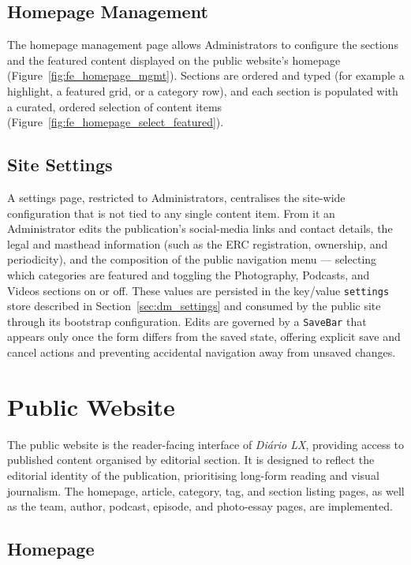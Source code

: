 \subsection{Homepage Management} \label{sec:fe_homepage_mgmt_sec}

The homepage management page allows Administrators to configure the sections and the
featured content displayed on the public website's homepage
(Figure~\ref{fig:fe_homepage_mgmt}). Sections are ordered and typed (for example a
highlight, a featured grid, or a category row), and each section is populated with a
curated, ordered selection of content items (Figure~\ref{fig:fe_homepage_select_featured}).

\subsection{Site Settings} \label{sec:fe_settings}

A settings page, restricted to Administrators, centralises the site-wide configuration
that is not tied to any single content item. From it an Administrator edits the
publication's social-media links and contact details, the legal and masthead information
(such as the ERC registration, ownership, and periodicity), and the composition of the
public navigation menu --- selecting which categories are featured and toggling the
Photography, Podcasts, and Videos sections on or off. These values are persisted in the
key/value \texttt{settings} store described in Section~\ref{sec:dm_settings} and consumed
by the public site through its bootstrap configuration. Edits are governed by a
\texttt{SaveBar} that appears only once the form differs from the saved state, offering
explicit save and cancel actions and preventing accidental navigation away from unsaved
changes.

\section{Public Website} \label{sec:fe_public}

The public website is the reader-facing interface of \textit{Diário LX}, providing
access to published content organised by editorial section. It is designed to reflect
the editorial identity of the publication, prioritising long-form reading and visual
journalism. The homepage, article, category, tag, and section listing pages, as well
as the team, author, podcast, episode, and photo-essay pages, are implemented.

\subsection{Homepage} \label{sec:fe_homepage}

